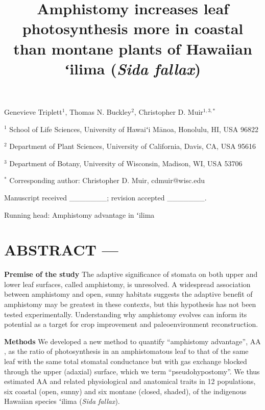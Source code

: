 \documentclass[
  letterpaper,
  DIV=11,
  numbers=noendperiod]{scrartcl}
\title{Amphistomy increases leaf photosynthesis more in coastal than
montane plants of Hawaiian ʻilima (\emph{Sida fallax})}
\author{}
\date{}
\begin{document}
\maketitle
\ifdefined\Shaded\renewenvironment{Shaded}{\begin{tcolorbox}[enhanced, interior hidden, sharp corners, borderline west={3pt}{0pt}{shadecolor}, boxrule=0pt, breakable, frame hidden]}{\end{tcolorbox}}\fi

\begin{center}
Genevieve Triplett$^1$, Thomas N. Buckley$^2$, Christopher D. Muir$^{1,3,*}$
\end{center}

\(^1\) School of Life Sciences, University of Hawaiʻi Mānoa, Honolulu,
HI, USA 96822

\(^2\) Department of Plant Sciences, University of California, Davis,
CA, USA 95616

\(^3\) Department of Botany, University of Wisconsin, Madison, WI, USA
53706

\(^*\) Corresponding author: Christopher D. Muir, cdmuir@wisc.edu

Manuscript received \_\_\_\_\_\_\_; revision accepted \_\_\_\_\_\_\_.

Running head: Amphistomy advantage in ʻilima

\newpage

\hypertarget{abstract}{%
\section{ABSTRACT ---}\label{abstract}}

\noindent \textbf{Premise of the study} The adaptive significance of
stomata on both upper and lower leaf surfaces, called amphistomy, is
unresolved. A widespread association between amphistomy and open, sunny
habitats suggests the adaptive benefit of amphistomy may be greatest in
these contexts, but this hypothesis has not been tested experimentally.
Understanding why amphistomy evolves can inform its potential as a
target for crop improvement and paleoenvironment reconstruction.

\textbf{Methods} We developed a new method to quantify ``amphistomy
advantage'', \(\mathrm{AA}\), as the ratio of photosynthesis in an
amphistomatous leaf to that of the same leaf with the same total
stomatal conductance but with gas exchange blocked through the upper
(adaxial) surface, which we term ``pseudohypostomy''. We thus estimated
\(\mathrm{AA}\) and related physiological and anatomical traits in 12
populations, six coastal (open, sunny) and six montane (closed, shaded),
of the indigenous Hawaiian species ʻilima (\emph{Sida fallax}).
\end{document}
